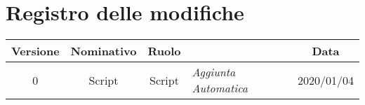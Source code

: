 \section*{Registro delle modifiche}
\renewcommand{\arraystretch}{1.8}

    \begin{longtable}{|c|c|c|p{3.8cm}|c|}
        \hline
        \rowcolor{header}
        \textbf{Versione} & \textbf{Nominativo} & \textbf{Ruolo} & \centering{\textbf{Descrizione}} & \textbf{Data} \\ 
        \hline 
        0 & Script & Script & \small{\textit{ Aggiunta Automatica }} & 2020/01/04 \\ 
        \hline
    \end{longtable}